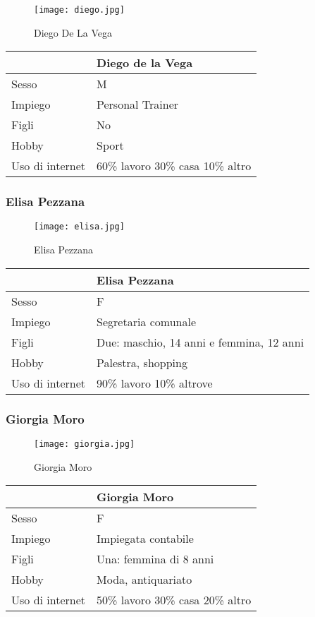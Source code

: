 \documentclass[12pt,italian,]{report}
\begin{document}
\begin{figure}
\centering
\texttt{[image: diego.jpg]}
\caption{Diego De La Vega}
\end{figure}

\begin{longtable}[]{@{}ll@{}}
\toprule
& Diego de la Vega\tabularnewline
\midrule
\endhead
Sesso & M\tabularnewline
Impiego & Personal Trainer\tabularnewline
Figli & No\tabularnewline
Hobby & Sport\tabularnewline
Uso di internet & 60\% lavoro 30\% casa 10\% altro\tabularnewline
\bottomrule
\end{longtable}

\hypertarget{elisa-pezzana}{%
\subsubsection{Elisa Pezzana}\label{elisa-pezzana}}

\begin{figure}
\centering
\texttt{[image: elisa.jpg]}
\caption{Elisa Pezzana}
\end{figure}

\begin{longtable}[]{@{}ll@{}}
\toprule
& Elisa Pezzana\tabularnewline
\midrule
\endhead
Sesso & F\tabularnewline
Impiego & Segretaria comunale\tabularnewline
Figli & Due: maschio, 14 anni e femmina, 12 anni\tabularnewline
Hobby & Palestra, shopping\tabularnewline
Uso di internet & 90\% lavoro 10\% altrove\tabularnewline
\bottomrule
\end{longtable}

\hypertarget{giorgia-moro}{%
\subsubsection{Giorgia Moro}\label{giorgia-moro}}

\begin{figure}
\centering
\texttt{[image: giorgia.jpg]}
\caption{Giorgia Moro}
\end{figure}

\begin{longtable}[]{@{}ll@{}}
\toprule
& Giorgia Moro\tabularnewline
\midrule
\endhead
Sesso & F\tabularnewline
Impiego & Impiegata contabile\tabularnewline
Figli & Una: femmina di 8 anni\tabularnewline
Hobby & Moda, antiquariato\tabularnewline
Uso di internet & 50\% lavoro 30\% casa 20\% altro\tabularnewline
\bottomrule
\end{longtable}
\end{document}
